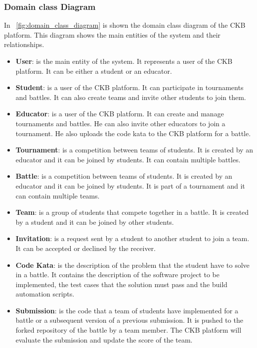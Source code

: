 \subsubsection{Domain class Diagram}
In \figurename~\ref{fig:domain_class_diagram} is shown the domain class diagram of the CKB platform. This diagram shows the main entities of the system and their relationships.
\begin{itemize}
    \item \textbf{User}: is the main entity of the system. It represents a user of the CKB platform. It can be either a student or an educator.
    \item \textbf{Student}: is a user of the CKB platform. It can participate in tournaments and battles. It can also create teams and invite other students to join them.
    \item \textbf{Educator}: is a user of the CKB platform. It can create and manage tournaments and battles. He can also invite other educators to join a tournament. He also uploads the code kata to the CKB platform for a battle.
    \item \textbf{Tournament}: is a competition between teams of students. It is created by an educator and it can be joined by students. It can contain multiple battles.
    \item \textbf{Battle}: is a competition between teams of students. It is created by an educator and it can be joined by students. It is part of a tournament and it can contain multiple teams.
    \item \textbf{Team}: is a group of students that compete together in a battle. It is created by a student and it can be joined by other students.
    \item \textbf{Invitation}: is a request sent by a student to another student to join a team. It can be accepted or declined by the receiver.
    \item \textbf{Code Kata}: is the description of the problem that the student have to solve in a battle. It contains the description of the software project to be implemented, the test cases that the solution must pass and the build automation scripts.
    \item \textbf{Submission}: is the code that a team of students have implemented for a battle or a subsequent version of a previous submission. It is pushed to the forked repository of the battle by a team member. The CKB platform will evaluate the submission and update the score of the team.
\end{itemize}

